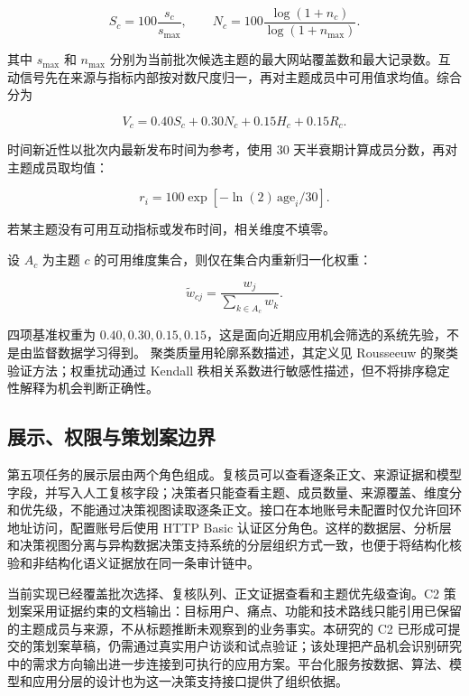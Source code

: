 \begin{equation}
 S_c=100\frac{s_c}{s_{\max}},\qquad
 N_c=100\frac{\log(1+n_c)}{\log(1+n_{\max})}.
 \label{eq:normalization}
\end{equation}

其中 $s_{\max}$ 和 $n_{\max}$ 分别为当前批次候选主题的最大网站覆盖数和最大记录数。互动信号先在来源与指标内部按对数尺度归一，再对主题成员中可用值求均值。综合分为

\begin{equation}
 V_c=0.40S_c+0.30N_c+0.15H_c+0.15R_c .
 \label{eq:value}
\end{equation}

时间新近性以批次内最新发布时间为参考，使用 30 天半衰期计算成员分数，再对主题成员取均值：

\begin{equation}
r_i=100\exp[-\ln(2)\,\mathrm{age}_i/30].
\end{equation}

若某主题没有可用互动指标或发布时间，相关维度不填零。

设 $A_c$ 为主题 $c$ 的可用维度集合，则仅在集合内重新归一化权重：

\begin{equation}
\tilde w_{cj}=\frac{w_j}{\sum_{k\in A_c}w_k}.
\end{equation}

四项基准权重为
$0.40,0.30,0.15,0.15$，这是面向近期应用机会筛选的系统先验，不是由监督数据学习得到。
聚类质量用轮廓系数描述，其定义见 Rousseeuw 的聚类验证方法\cite{rouseeuw1987}；权重扰动通过 Kendall 秩相关系数\cite{kendall1938}进行敏感性描述，但不将排序稳定性解释为机会判断正确性。

\subsection{展示、权限与策划案边界}

第五项任务的展示层由两个角色组成。复核员可以查看逐条正文、来源证据和模型字段，并写入人工复核字段；决策者只能查看主题、成员数量、来源覆盖、维度分和优先级，不能通过决策视图读取逐条正文。接口在本地账号未配置时仅允许回环地址访问，配置账号后使用 HTTP Basic 认证区分角色。这样的数据层、分析层和决策视图分离与异构数据决策支持系统的分层组织方式一致\cite{zhang2025fire}，也便于将结构化核验和非结构化语义证据放在同一条审计链中\cite{xu2025audit}。

当前实现已经覆盖批次选择、复核队列、正文证据查看和主题优先级查询。C2 策划案采用证据约束的文档输出：目标用户、痛点、功能和技术路线只能引用已保留的主题成员与来源，不从标题推断未观察到的业务事实。本研究的 C2 已形成可提交的策划案草稿，仍需通过真实用户访谈和试点验证；该处理把产品机会识别研究中的需求方向输出进一步连接到可执行的应用方案\cite{li2026productopportunity}。平台化服务按数据、算法、模型和应用分层的设计也为这一决策支持接口提供了组织依据\cite{liang2025platform}。
